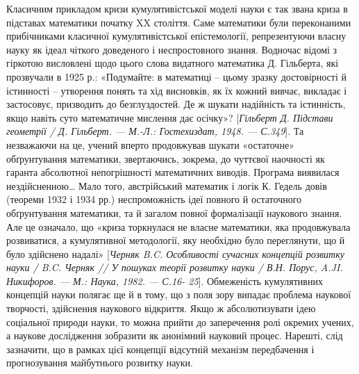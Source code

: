 Класичним прикладом кризи кумулятивістської моделі науки є так звана
криза в підставах математики початку XX століття. Саме математики були
переконаними прибічниками класичної кумулятивістської епістемології,
репрезентуючи власну науку як ідеал чіткого доведеного і неспростовного
знання. Водночас відомі з гіркотою висловлені щодо цього слова видатного
математика Д. Гільберта, які прозвучали в 1925 р.: «Подумайте: в математиці –
цьому зразку достовірності й істинності – утворення понять та хід висновків, як
їх кожний вивчає, викладає і застосовує, призводить до безглуздостей. Де ж
шукати надійність та істинність, якщо навіть суто математичне мислення дає
осічку»? [\textit{Гільберт Д. Підстави геометрії / Д. Гільберт. --- М.-Л.: Гостехиздат,
1948. --- С.349}]. Та незважаючи на це, учений вперто продовжував шукати
«остаточне» обґрунтування математики, звертаючись, зокрема, до чуттєвої
наочності як гаранта абсолютної непогрішності математичних виводів.
Програма виявилася нездійсненною… Мало того, австрійський математик і
логік К. Гедель довів (теореми 1932 і 1934 рр.) неспроможність ідеї повного й
остаточного обґрунтування математики, та й загалом повної формалізації
наукового знання. Але це означало, що «криза торкнулася не власне
математики, яка продовжувала розвиватися, а кумулятивної методології, яку
необхідно було переглянути, що й було здійснено надалі» [\textit{Черняк B.C.
Особливості сучасних концепцій розвитку науки / B.C. Черняк // У пошуках
теорії розвитку науки / В.Н. Порус, A.JI. Никифоров. --- М.: Наука, 1982. --- С.16-
25}]. Обмеженість кумулятивних концепцій науки полягає ще й в тому, що з
поля зору випадає проблема наукової творчості, здійснення наукового
відкриття. Якщо ж абсолютизувати ідею соціальної природи науки, то можна
прийти до заперечення ролі окремих учених, а наукове дослідження зобразити
як анонімний науковий процес. Нарешті, слід зазначити, що в рамках цієї
концепції відсутній механізм передбачення і прогнозування майбутнього
розвитку науки.

